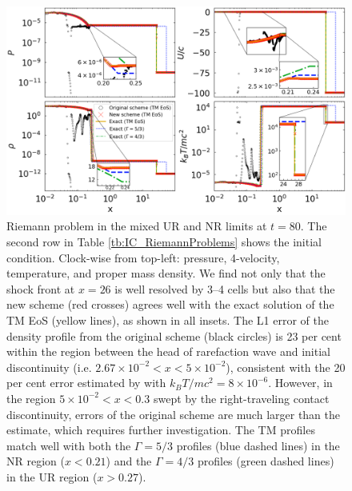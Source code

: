 \begin{figure}
\includegraphics[width=\linewidth]{figures/RiemannProbs.png}
\centering
\caption{Riemann problem in the mixed UR and NR limits at $t=80$. The second row in Table \ref{tb:IC_RiemannProblems} shows the initial condition. Clock-wise from top-left: pressure, 4-velocity, temperature, and proper mass density. We find not only that the shock front at $x=26$ is well resolved by 3--4 cells but also that the new scheme (red crosses) agrees well with the exact solution of the TM EoS (yellow lines), as shown in all insets. The L1 error of the density profile from the original scheme (black circles) is 23 per cent within the region between the head of rarefaction wave and initial discontinuity (i.e. $2.67\times 10^{-2}<x<5\times10^{-2}$), consistent with the 20 per cent error estimated by  with $k_{B}T/mc^2=8\times10^{-6}$. However, in the region $5\times10^{-2}<x<0.3$ swept by the right-traveling contact discontinuity, errors of the original scheme are much larger than the estimate, which requires further investigation. The TM profiles match well with both the $\Gamma=5/3$ profiles (blue dashed lines) in the NR region ($x<0.21$) and the $\Gamma=4/3$ profiles (green dashed lines) in the UR region ($x>0.27$).}
\label{fig:non-relativistic shock tube}
\end{figure}

